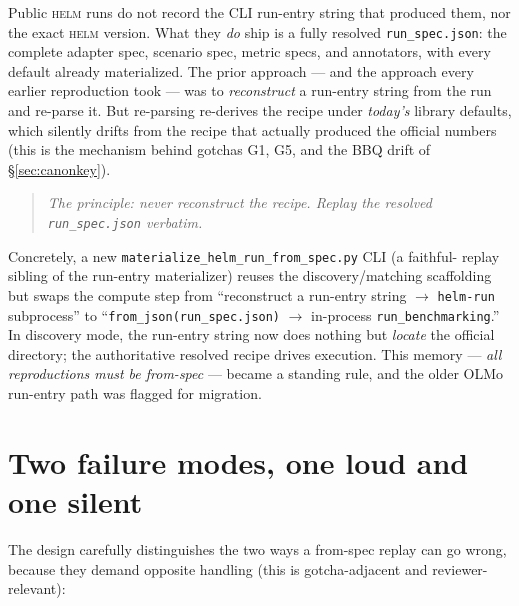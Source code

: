 \documentclass[11pt]{report}
\newcommand{\code}[1]{\texttt{#1}}
\newcommand{\file}[1]{\texttt{#1}}
\begin{document}
Public \textsc{helm} runs do not record the CLI run-entry string that produced
them, nor the exact \textsc{helm} version. What they \emph{do} ship is a fully
resolved \file{run\_spec.json}: the complete adapter spec, scenario spec, metric
specs, and annotators, with every default already materialized. The prior approach
--- and the approach every earlier reproduction took --- was to \emph{reconstruct}
a run-entry string from the run and re-parse it. But re-parsing re-derives the
recipe under \emph{today's} library defaults, which silently drifts from the
recipe that actually produced the official numbers (this is the mechanism behind
gotchas G1, G5, and the BBQ drift of \S\ref{sec:canonkey}).

\begin{quote}\itshape
The principle: never reconstruct the recipe. Replay the resolved
\file{run\_spec.json} \emph{verbatim}.
\end{quote}

Concretely, a new \code{materialize\_helm\_run\_from\_spec.py} CLI (a faithful-
replay sibling of the run-entry materializer) reuses the discovery/matching
scaffolding but swaps the compute step from ``reconstruct a run-entry string
$\rightarrow$ \code{helm-run} subprocess'' to ``\code{from\_json(run\_spec.json)}
$\rightarrow$ in-process \code{run\_benchmarking}.'' In discovery mode, the
run-entry string now does nothing but \emph{locate} the official directory; the
authoritative resolved recipe drives execution. This memory --- \emph{all
reproductions must be from-spec} --- became a standing rule, and the older OLMo
run-entry path was flagged for migration.

\section{Two failure modes, one loud and one silent}

The design carefully distinguishes the two ways a from-spec replay can go wrong,
because they demand opposite handling (this is gotcha-adjacent and reviewer-
relevant):
\end{document}
